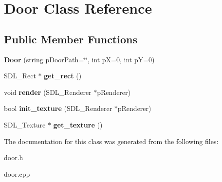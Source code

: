 \hypertarget{classDoor}{}\section{Door Class Reference}
\label{classDoor}
\subsection*{Public Member Functions}
\begin{DoxyCompactItemize}
\item 
\mbox{\label{classDoor_afab9016c54e01ec39eee4db3714e7930}} 
{\bfseries Door} (string p\+Door\+Path=\char`\"{}\char`\"{}, int pX=0, int pY=0)
\item 
\mbox{\label{classDoor_ab081235692c0ac1758feeba3261222d4}} 
S\+D\+L\+\_\+\+Rect $\ast$ {\bfseries get\+\_\+rect} ()
\item 
\mbox{\label{classDoor_a88ca10062d8fde94e0653e06068779ac}} 
void {\bfseries render} (S\+D\+L\+\_\+\+Renderer $\ast$p\+Renderer)
\item 
\mbox{\label{classDoor_ad795c3e099769e06b74f8591684f0e0e}} 
bool {\bfseries init\+\_\+texture} (S\+D\+L\+\_\+\+Renderer $\ast$p\+Renderer)
\item 
\mbox{\label{classDoor_a66da76ab2ec9d12951307f52cff98a64}} 
S\+D\+L\+\_\+\+Texture $\ast$ {\bfseries get\+\_\+texture} ()
\end{DoxyCompactItemize}


The documentation for this class was generated from the following files\+:\begin{DoxyCompactItemize}
\item 
door.\+h\item 
door.\+cpp\end{DoxyCompactItemize}
